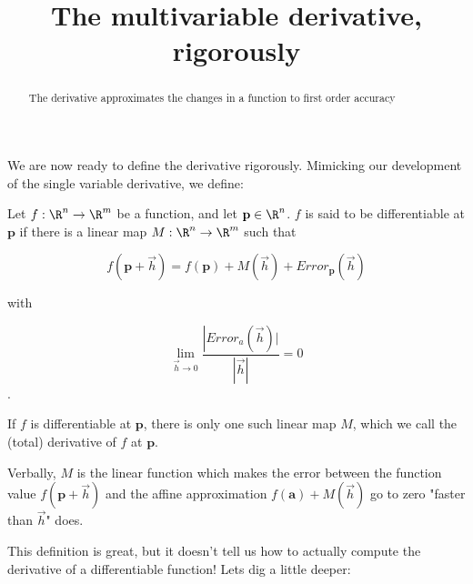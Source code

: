 \documentclass{ximera}
\title{The multivariable derivative, rigorously}
\begin{document}
	\begin{abstract}
		The derivative approximates the changes in a function to first order accuracy
	\end{abstract}
	
	We are now ready to define the derivative rigorously.  Mimicking our development of the single variable derivative, we define:

\begin{definition}
	Let $f :\R^n \to \R^m$ be a function, and let $\mathbf{p} \in \R^n$.  
	 $f$ is said to be differentiable at $\mathbf{p}$ if there is a linear map $M:\R^n \to \R^m$ such that 
		
		\[ f(\mathbf{p}+\vec{h}) = f(\mathbf{p}) + M(\vec{h})+ Error_{\mathbf{p}}(\vec{h})\]
		
		with
		
		\[ \lim_{\vec{h} \to 0} \frac{\left|Error_a(\vec{h})|}{\left|\vec{h}\right|} = 0 \].
		
		If $f$ is differentiable at $\mathbf{p}$, there is only one such linear map $M$, which we call the (total) derivative of $f$ at $\mathbf{p}$.  
		
		Verbally,  $M$ is the linear function which makes the error between the function value $f(\mathbf{p}+\vec{h})$ and the affine approximation 
		$f(\mathbf{a})+M(\vec{h})$ go to zero "faster than $\vec{h}$" does.
\end{definition}

This definition is great, but it doesn't tell us how to actually compute the derivative of a differentiable function!  Lets dig a little deeper:
\end{document}
